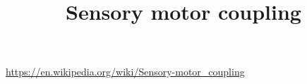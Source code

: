 \documentclass[a4paper]{article}
\title{Sensory motor coupling}
\date{}
\begin{document}
    \maketitle
    \url{https://en.wikipedia.org/wiki/Sensory-motor_coupling}
\end{document}
